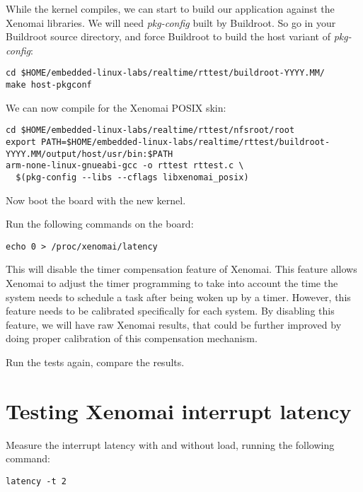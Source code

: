 While the kernel compiles, we can start to build our application against
the Xenomai libraries. We will need {\em pkg-config} built by Buildroot.
So go in your Buildroot source directory, and force Buildroot to build
the host variant of {\em pkg-config}:

\begin{verbatim}
cd $HOME/embedded-linux-labs/realtime/rttest/buildroot-YYYY.MM/
make host-pkgconf
\end{verbatim}

We can now compile  for the Xenomai POSIX skin:

\scriptsize
\begin{verbatim}
cd $HOME/embedded-linux-labs/realtime/rttest/nfsroot/root
export PATH=$HOME/embedded-linux-labs/realtime/rttest/buildroot-YYYY.MM/output/host/usr/bin:$PATH
arm-none-linux-gnueabi-gcc -o rttest rttest.c \
  $(pkg-config --libs --cflags libxenomai_posix)
\end{verbatim}
\normalsize

Now boot the board with the new kernel.

Run the following commands on the board:

\begin{verbatim}
echo 0 > /proc/xenomai/latency
\end{verbatim}

This will disable the timer compensation feature of Xenomai. This
feature allows Xenomai to adjust the timer programming to take into
account the time the system needs to schedule a task after being woken
up by a timer. However, this feature needs to be calibrated
specifically for each system. By disabling this feature, we will have
raw Xenomai results, that could be further improved by doing proper
calibration of this compensation mechanism.

Run the tests again, compare the results.

\section{Testing Xenomai interrupt latency}

Measure the interrupt latency with and without load, running the
following command:

\begin{verbatim}
latency -t 2
\end{verbatim}
